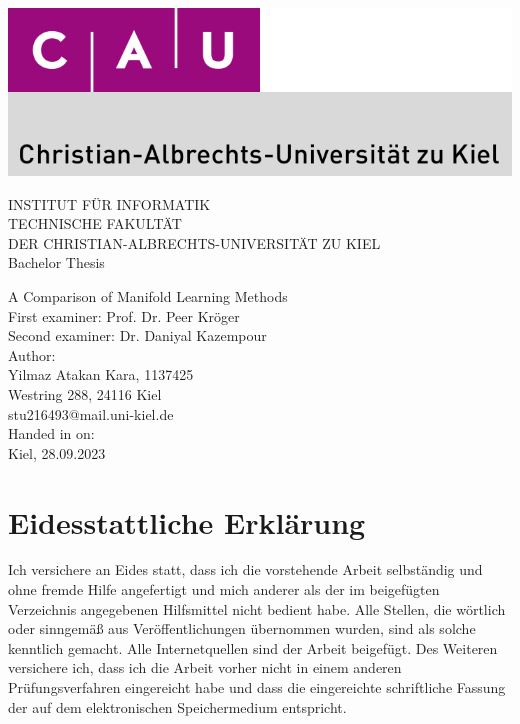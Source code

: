 \documentclass[
	pdftex,			%
	11pt,			%
	a4paper, 		%
	twoside, 		%
	BCOR=2cm,		%
	DIV=11,			%
	listof=totoc
]{report}
\begin{document}
\hypersetup{pageanchor=false}
\thispagestyle{empty}
\includegraphics[width=\columnwidth]{images/cau-norm-de-lilagrey-rgb-0720.png}


\begin{center}

    \vspace{1cm}
    INSTITUT FÜR INFORMATIK \\
    TECHNISCHE FAKULTÄT \\
    DER CHRISTIAN-ALBRECHTS-UNIVERSITÄT ZU KIEL \\
    
    \vspace{2cm}
    {\huge Bachelor Thesis}
    
    \vspace{2.25cm}
    {\Huge A Comparison of Manifold Learning Methods} \\
    
    \vspace{3cm}
    First examiner: Prof. Dr. Peer Kröger \\
    Second examiner: Dr. Daniyal Kazempour \\
    
    \vspace{1.75cm}
    Author: \\
    {Yilmaz Atakan Kara, 1137425} \\
    {Westring 288, 24116 Kiel} \\
    {stu216493@mail.uni-kiel.de} \\
    
    \vspace{1.25cm}
    Handed in on: \\
    Kiel, 28.09.2023
    
\end{center}

\newpage
\section*{Eidesstattliche Erklärung}
Ich versichere an Eides statt, dass ich die vorstehende Arbeit selbständig und ohne fremde Hilfe angefertigt und mich anderer als der im beigefügten Verzeichnis angegebenen Hilfsmittel nicht bedient habe. Alle Stellen, die wörtlich oder sinngemäß aus Veröffentlichungen übernommen wurden, sind als solche kenntlich gemacht. Alle Internetquellen sind der Arbeit beigefügt. Des Weiteren versichere ich, dass ich die Arbeit vorher nicht in einem anderen Prüfungsverfahren eingereicht habe und dass die eingereichte schriftliche Fassung der auf dem elektronischen Speichermedium entspricht.\\
\end{document}
